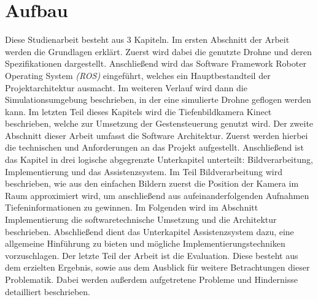 \section{Aufbau}
Diese Studienarbeit besteht aus 3 Kapiteln. Im ersten Abschnitt der Arbeit werden die Grundlagen erklärt. Zuerst wird dabei die genutzte Drohne und deren Spezifikationen dargestellt. \newline
Anschließend wird das Software Framework Roboter Operating System \emph{(ROS)} eingeführt, welches ein Hauptbestandteil der Projektarchitektur ausmacht.\newline
Im weiteren Verlauf wird dann die Simulationsumgebung beschrieben, in der eine simulierte Drohne geflogen werden kann.
Im letzten Teil dieses Kapitels wird die Tiefenbildkamera Kinect beschrieben, welche zur Umsetzung der Gestensteuerung genutzt wird. \newline
Der zweite Abschnitt dieser Arbeit umfasst die Software Architektur. Zuerst werden hierbei die technischen und Anforderungen an das Projekt aufgestellt. Anschließend ist das Kapitel in drei logische abgegrenzte Unterkapitel unterteilt: Bildverarbeitung, Implementierung und das Assistenzsystem. \newline
Im Teil Bildverarbeitung wird beschrieben, wie aus den einfachen Bildern zuerst die Position der Kamera im Raum approximiert wird, um anschließend aus aufeinanderfolgenden Aufnahmen Tiefeninformationen zu gewinnen. \newline
Im Folgenden wird im Abschnitt Implementierung die softwaretechnische Umsetzung und die Architektur beschrieben. Abschließend dient das Unterkapitel Assistenzsystem dazu, eine allgemeine Hinführung zu bieten und mögliche Implementierungstechniken vorzuschlagen. \newline
Der letzte Teil der Arbeit ist die Evaluation. Diese besteht aus dem erzielten Ergebnis, sowie aus dem Ausblick für weitere Betrachtungen dieser Problematik. Dabei werden außerdem aufgetretene Probleme und Hindernisse detailliert beschrieben.

